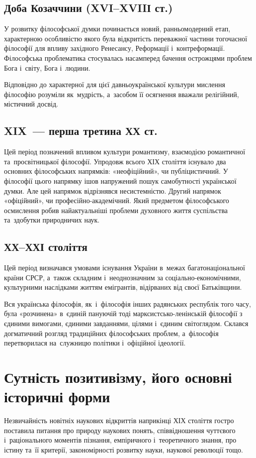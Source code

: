 \documentclass[a5paper,oneside,DIV=12,12pt,headings=small]{scrartcl}
\begin{document}
		\subsection{Доба Козаччини (XVI–XVIIІ ст.)}
			У розвитку філософської думки починається новий, ранньомодерний етап, характерною особливістю якого була відкритість переважної частини тогочасної філософії для впливу західного Ренесансу, Реформації і~контреформації. Філософська проблематика стосувалась насамперед бачення острожцями проблем Бога і~світу, Бога і~людини.
			
			Відповідно до характерної для цієї давньоукраїнської культури мислення філософію розуміли як~мудрість, а~засобом її осягнення вважали релігійний, містичний досвід.
			
		\subsection{XIX~— перша третина ХХ ст.}
			Цей період позначений впливом культури романтизму, взаємодією романтичної та~просвітницької філософії. Упродовж всього ХІХ століття існувало два основних філософських напрямків: «неофіційний», чи публіцистичний. У філософії цього напрямку  ішов напружений пошук самобутності української думки. Але цей напрямок відрізнявся несистемністю. Другий напрямок «офіційний», чи професійно-академічний. Який предметом філософського осмислення робив найактуальніші проблеми духовного життя суспільства та~здобутки природничих наук.
			
		\subsection{ХХ–ХХІ століття}
			Цей період визначався умовами існування України в~межах багатонаціональної країни СРСР, а~також   складним і~неоднозначним за соціально-економічними, культурними наслідками життям емігрантів, відірваних від своєї Батьківщини.
			
			Вся українська філософія, як~і~філософія інших радянських республік того часу, була «розчинена» в~єдиній пануючій тоді марк\-сист\-сько-ле\-нін\-ській філософії з єдиними вимогами, єдиними завданнями, цілями і~єдиним світоглядом. Склався догматичний розгляд традиційних філософських проблем, а~філософія перетворилася на~служницю політики і~офіційної ідеології.
			
	\section{Сутність позитивізму, його основні історичні форми}
		Незвичайність новітніх наукових відкриттів наприкінці ХІХ століття гостро поставила питання про  природу наукових понять, співвідношення чуттєвого і~раціонального моментів пізнання, емпіричного і~теоретичного знання, про істину та~її критерії, закономірності розвитку науки, наукової революції тощо. 
		
\end{document}
